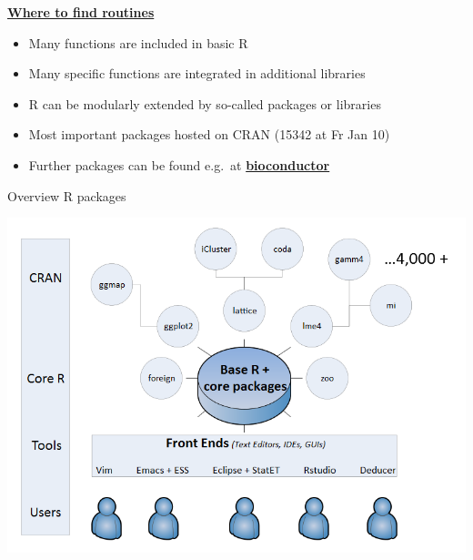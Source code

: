 \documentclass[
  10pt,
  ignorenonframetext,
]{beamer}
\providecommand{\tightlist}{%
  \setlength{\itemsep}{0pt}\setlength{\parskip}{0pt}}
\begin{document}
\begin{frame}{\href{https://stats.idre.ucla.edu/r/seminars/intro/}{\textbf{Where
to find routines}}}
\protect\hypertarget{where-to-find-routines}{}

\begin{itemize}
\tightlist
\item
  Many functions are included in basic R
\item
  Many specific functions are integrated in additional libraries
\item
  R can be modularly extended by so-called packages or libraries
\item
  Most important packages hosted on CRAN (15342 at Fr Jan 10)
\item
  Further packages can be found e.g.~at
  \href{www.bioconductor.org}{\textbf{bioconductor}}
\end{itemize}

\begin{block}{Overview R packages}

\includegraphics[width=\textwidth,height=0.6\textheight]{figure/Packages.PNG}

\end{block}

\end{frame}
\end{document}

